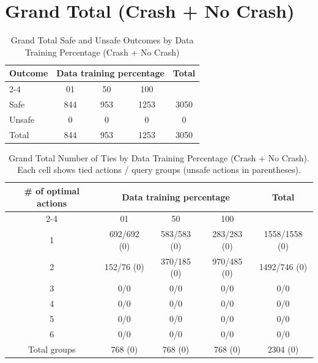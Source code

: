 \documentclass{article}
\begin{document}
\pagebreak
\section{Grand Total (Crash + No Crash)}

\begin{table}[h]
\centering
\caption{Grand Total Safe and Unsafe Outcomes by Data Training Percentage (Crash + No Crash)}
\begin{tabular}{l|ccc|c}
\toprule
\multirow{2}{*}{Outcome} & \multicolumn{3}{c|}{Data training percentage} & \multirow{2}{*}{Total} \\
\cmidrule{2-4}
 & 01 & 50 & 100 & \\
\midrule
Safe & 844 & 953 & 1253 & 3050 \\ 
Unsafe & 0 & 0 & 0 & 0 \\ 
\midrule
Total & 844 & 953 & 1253 & 3050 \\ 
\bottomrule
\end{tabular}
\end{table}

\begin{table}[h]
\centering
\caption{Grand Total Number of Ties by Data Training Percentage (Crash + No Crash).
Each cell shows tied actions / query groups (unsafe actions in parentheses).}
\begin{tabular}{c|ccc|c}
\toprule
\multirow{2}{*}{\# of optimal actions} & \multicolumn{3}{c|}{Data training percentage} & \multirow{2}{*}{Total} \\
\cmidrule{2-4}
 & 01 & 50 & 100 & \\
\midrule
1 & 692/692 (0) & 583/583 (0) & 283/283 (0) & 1558/1558 (0) \\ 
2 & 152/76 (0) & 370/185 (0) & 970/485 (0) & 1492/746 (0) \\ 
3 & 0/0 & 0/0 & 0/0 & 0/0 \\ 
4 & 0/0 & 0/0 & 0/0 & 0/0 \\ 
5 & 0/0 & 0/0 & 0/0 & 0/0 \\ 
6 & 0/0 & 0/0 & 0/0 & 0/0 \\ 
\midrule
Total groups & 768 (0) & 768 (0) & 768 (0) & 2304 (0) \\ 
\bottomrule
\end{tabular}
\end{table}
\end{document}
